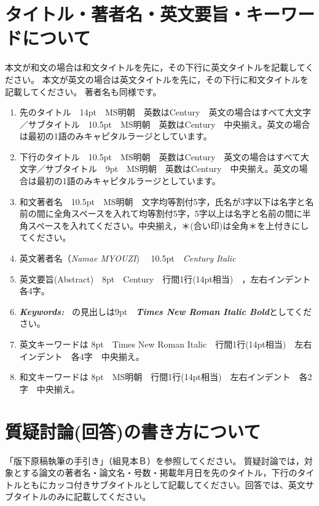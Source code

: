 \documentclass[base=10pt,magstyle=real,a4paper,twocolumn,xelatex,pandoc,jafont=ms]{bxjsarticle}
\begin{document}
\section{タイトル・著者名・英文要旨・キーワードについて}
	本文が和文の場合は和文タイトルを先に，その下行に英文タイトルを記載してください。
	本文が英文の場合は英文タイトルを先に，その下行に和文タイトルを記載してください。
	著者名も同様です。
	
	\begin{enumerate}
		\renewcommand{\labelenumi}{$ \textcircled{\scriptsize\arabic{enumi}} $}%
		\item 先のタイトル　14pt　MS明朝　英数はCentury　英文の場合はすべて大文字／サブタイトル　10.5pt　MS明朝　英数はCentury　中央揃え。英文の場合は最初の1語のみキャピタルラージとしています。
		
		\item 下行のタイトル　10.5pt　MS明朝　英数はCentury　英文の場合はすべて大文字／サブタイトル　9pt　MS明朝　英数はCentury　中央揃え。英文の場合は最初の1語のみキャピタルラージとしています。
		
		\item 和文著者名　10.5pt　MS明朝　文字均等割付5字，氏名が3字以下は名字と名前の間に全角スペースを入れて均等割付5字，5字以上は名字と名前の間に半角スペースを入れてください。中央揃え，＊(合い印)は全角＊を上付きにしてください。
		
		\item 英文著者名（\textit{Namae MYOUZI})　 10.5pt　\textit{Century Italic}  
		
		\item 英文要旨(Abstract)　8pt　Century　行間1行(14pt相当)　，左右インデント　各4字。	
		
		\item {\timesnewroman\textit {\textbf{Keywords:~}}} の見出しは9pt　{\timesnewroman\textit {\textbf{Times New Roman Italic Bold}}}としてください。

		\item 英文キーワードは 8pt　Times New Roman Italic　行間1行(14pt相当)　左右インデント　各4字　中央揃え。

		\item 和文キーワードは 8pt　MS明朝　行間1行(14pt相当)　左右インデント　各2字　中央揃え。
		
	\end{enumerate}

\section{質疑討論(回答)の書き方について}
「版下原稿執筆の手引き」（組見本Ｂ）を参照してください。
質疑討論では，対象とする論文の著者名・論文名・号数・掲載年月日を先のタイトル，下行のタイトルともにカッコ付きサブタイトルとして記載してください。回答では、英文サブタイトルのみに記載してください。
\end{document}
